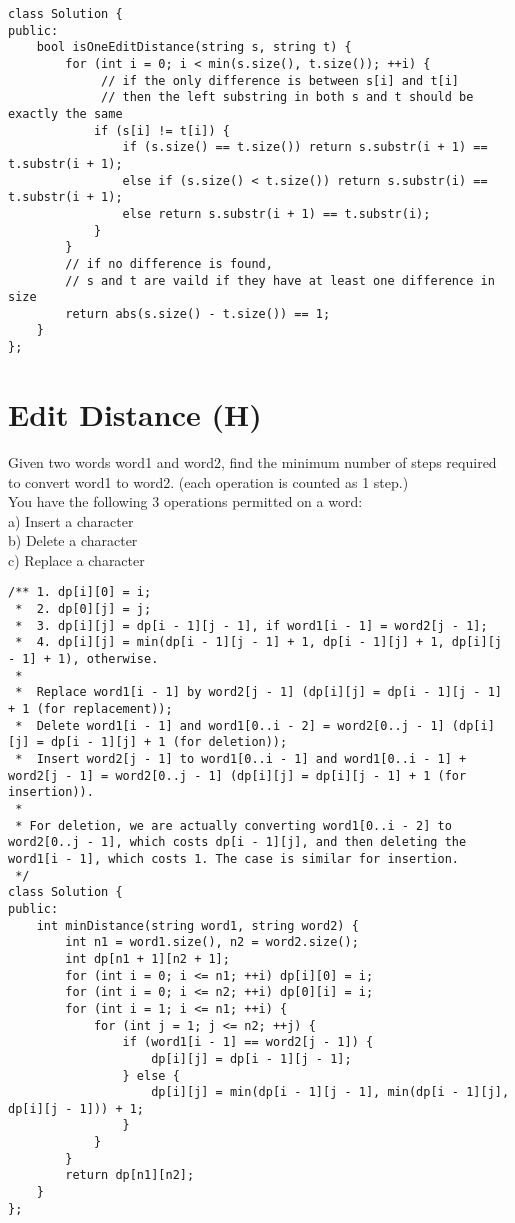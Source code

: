 \begin{lstlisting}
class Solution {
public:
    bool isOneEditDistance(string s, string t) {
        for (int i = 0; i < min(s.size(), t.size()); ++i) {
             // if the only difference is between s[i] and t[i]
             // then the left substring in both s and t should be exactly the same
            if (s[i] != t[i]) {
                if (s.size() == t.size()) return s.substr(i + 1) == t.substr(i + 1);
                else if (s.size() < t.size()) return s.substr(i) == t.substr(i + 1);
                else return s.substr(i + 1) == t.substr(i);
            }
        }
        // if no difference is found, 
        // s and t are vaild if they have at least one difference in size
        return abs(s.size() - t.size()) == 1;
    }
};
\end{lstlisting}


\section{Edit Distance (H)}
Given two words word1 and word2, find the minimum number of steps required to convert word1 to word2. (each operation is counted as 1 step.)\\

You have the following 3 operations permitted on a word:\\
a) Insert a character\\
b) Delete a character\\
c) Replace a character\\

\begin{lstlisting}
/** 1. dp[i][0] = i;
 *  2. dp[0][j] = j;
 *  3. dp[i][j] = dp[i - 1][j - 1], if word1[i - 1] = word2[j - 1];
 *  4. dp[i][j] = min(dp[i - 1][j - 1] + 1, dp[i - 1][j] + 1, dp[i][j - 1] + 1), otherwise.
 * 
 *  Replace word1[i - 1] by word2[j - 1] (dp[i][j] = dp[i - 1][j - 1] + 1 (for replacement));
 *  Delete word1[i - 1] and word1[0..i - 2] = word2[0..j - 1] (dp[i][j] = dp[i - 1][j] + 1 (for deletion));
 *  Insert word2[j - 1] to word1[0..i - 1] and word1[0..i - 1] + word2[j - 1] = word2[0..j - 1] (dp[i][j] = dp[i][j - 1] + 1 (for insertion)).
 *  
 * For deletion, we are actually converting word1[0..i - 2] to word2[0..j - 1], which costs dp[i - 1][j], and then deleting the word1[i - 1], which costs 1. The case is similar for insertion. 
 */
class Solution {
public:
    int minDistance(string word1, string word2) {
        int n1 = word1.size(), n2 = word2.size();
        int dp[n1 + 1][n2 + 1];
        for (int i = 0; i <= n1; ++i) dp[i][0] = i;
        for (int i = 0; i <= n2; ++i) dp[0][i] = i;
        for (int i = 1; i <= n1; ++i) {
            for (int j = 1; j <= n2; ++j) {
                if (word1[i - 1] == word2[j - 1]) {
                    dp[i][j] = dp[i - 1][j - 1];
                } else {
                    dp[i][j] = min(dp[i - 1][j - 1], min(dp[i - 1][j], dp[i][j - 1])) + 1;
                }
            }
        }
        return dp[n1][n2];
    }
};
\end{lstlisting}

